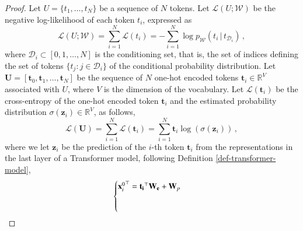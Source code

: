 \begin{proof}
%
Let $U = \{t_1, \dots, t_N\}$ be a  sequence of $N$ tokens.
%
Let $\mathcal{L}(U ; \mathcal{W})$ be the negative log-likelihood of each token $t_i$, expressed as
%
\begin{equation}
\label{eq:results:self-supervised-pretraining}
    \mathcal{L}(U;\mathcal{W}) =\sum_{i=1}^N \mathcal{L}(t_i)=  - \sum_{i=1}^N \log p_{\mathcal{W}}(t_i \,|\, t_{\mathcal{D}_i}) \,,
\end{equation}
%
%
where $\mathcal{D}_i \subset [0,1,\dots, N]$ is the conditioning set, that is, the set of indices defining the set of tokens $\{t_j: j \in \mathcal{D}_i\}$ of the conditional probability distribution.
%
Let $\bm{U} = [\bm{t}_0, \bm{t}_1, \dots, \bm{t}_N]$ be the sequence of $N$ one-hot encoded tokens $\bm{t}_i \in \mathbb{R}^V$ associated with $U$, where $V$ is the dimension of the vocabulary.
%
Let $\mathcal{L}(\bm{t}_i)$ be the cross-entropy of the one-hot encoded token $\bm{t}_i$  and the estimated probability distribution $\sigma(\bm{z}_i) \in \mathbb{R}^V$, as follows,
%
\begin{equation}
 \mathcal{L}(\bm{U}) = \sum_{i=1}^N \mathcal{L}(\bm{t}_i) = \sum_{i=1}^N \bm{t}_i\log(\sigma(\bm{z}_i))\,,
\end{equation}
%
where we let $\bm{z}_i$ be the prediction of the $i$-th token $\bm{t}_i$ from the representations in the last layer of a Transformer model, following Definition \ref{def-transformer-model},
%
%
%
%
\begin{equation}
\begin{cases}
%
{\bm{x}^0_i}^\top = \bm{t_i}^\top \bm{W_e} + \bm{W}_p \\[5pt]
\vspace{5pt}

\end{cases}
\end{equation}
\end{proof}
